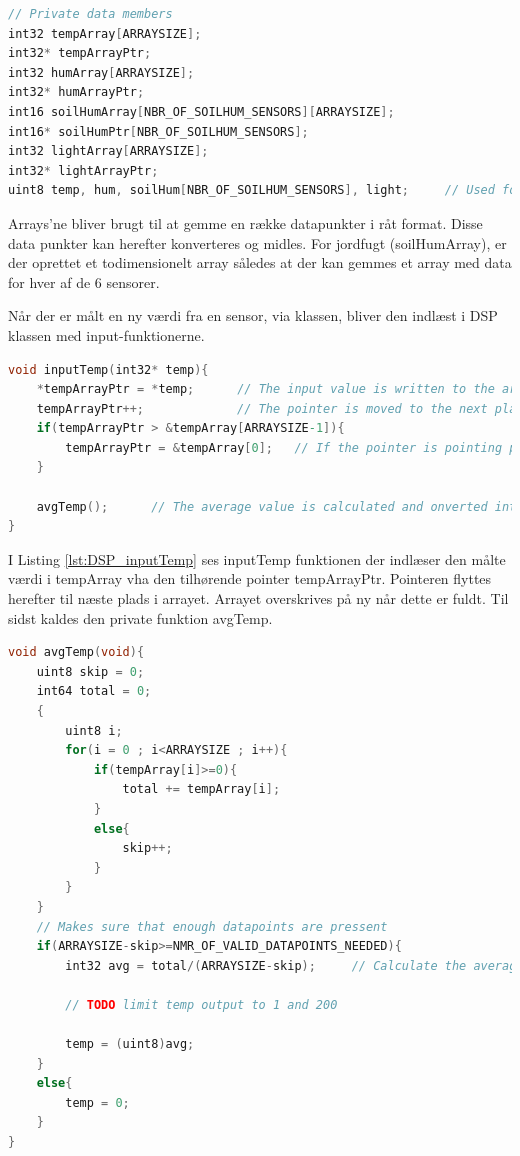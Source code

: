 \begin{lstlisting}[language=C, label=lst:DSP_decl, caption=Deklaration af arrays og pointers]
// Private data members
int32 tempArray[ARRAYSIZE];
int32* tempArrayPtr;
int32 humArray[ARRAYSIZE];
int32* humArrayPtr;
int16 soilHumArray[NBR_OF_SOILHUM_SENSORS][ARRAYSIZE];
int16* soilHumPtr[NBR_OF_SOILHUM_SENSORS];
int32 lightArray[ARRAYSIZE];
int32* lightArrayPtr;
uint8 temp, hum, soilHum[NBR_OF_SOILHUM_SENSORS], light;     // Used for storing the newest value
\end{lstlisting}

Arrays'ne bliver brugt til at gemme en række datapunkter i råt format. Disse data punkter kan herefter konverteres og midles.
For jordfugt (soilHumArray), er der oprettet et todimensionelt array således at der kan gemmes et array med data for hver af de 6 sensorer.

Når der er målt en ny værdi fra en sensor, via \IIC klassen, bliver den indlæst i DSP klassen med input-funktionerne.

\begin{lstlisting}[language=C, label=lst:DSP_inputTemp, caption=Funktion til at indlæse en sensorværdi i DSP klassen]
void inputTemp(int32* temp){
    *tempArrayPtr = *temp;      // The input value is written to the array
    tempArrayPtr++;             // The pointer is moved to the next place in array
    if(tempArrayPtr > &tempArray[ARRAYSIZE-1]){
        tempArrayPtr = &tempArray[0];   // If the pointer is pointing past the end of the array it's reset
    }
    
    avgTemp();      // The average value is calculated and onverted into temp(globel) 
}
\end{lstlisting}

I Listing \ref{lst:DSP_inputTemp} ses inputTemp funktionen der indlæser den målte værdi i tempArray vha den tilhørende pointer tempArrayPtr. Pointeren flyttes herefter til næste plads i arrayet. Arrayet overskrives på ny når dette er fuldt. Til sidst kaldes den private funktion avgTemp.

\begin{lstlisting}[language=C, label=lst:DSP_avgTemp, caption=Funktion til at indlæse en sensorværdi i DSP klassen]
void avgTemp(void){
    uint8 skip = 0;
    int64 total = 0;
    {
        uint8 i;
        for(i = 0 ; i<ARRAYSIZE ; i++){
            if(tempArray[i]>=0){
                total += tempArray[i];
            }
            else{
                skip++;
            }
        }
    }
    // Makes sure that enough datapoints are pressent
    if(ARRAYSIZE-skip>=NMR_OF_VALID_DATAPOINTS_NEEDED){    
        int32 avg = total/(ARRAYSIZE-skip);		// Calculate the average value
        
        // TODO limit temp output to 1 and 200
        
        temp = (uint8)avg;
    }
    else{
        temp = 0;
    }
}
\end{lstlisting}

